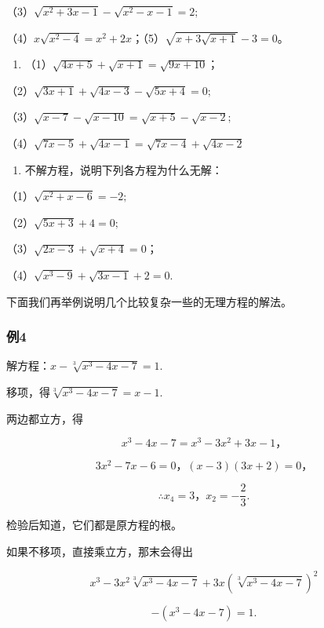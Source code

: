（3）\(\sqrt{x^2 + 3x - 1} - \sqrt{x^2 - x - 1} = 2;\)

（4）\(x\sqrt{x^2 - 4} = x^2 + 2x\)；（5）\(\sqrt{x + 3\sqrt{x + 1}} - 3 = 0\)。

\begin{enumerate}[start=4]
\item
  （1）\(\sqrt{4x + 5} + \sqrt{x + 1} = \sqrt{9x + 10}\)；
\end{enumerate}

（2）\(\sqrt{3x + 1} +\sqrt{4x - 3} -\sqrt{5x + 4} = 0;\)

（3）\(\sqrt{x - 7} - \sqrt{x - 10} = \sqrt{x + 5} - \sqrt{x - 2};\)

（4）\(\sqrt{7x - 5} +\sqrt{4x - 1} = \sqrt{7x - 4} +\sqrt{4x - 2}\)

\begin{enumerate}[start=5]
\item
  不解方程，说明下列各方程为什么无解：
\end{enumerate}

（1）\(\sqrt{x^2 + x - 6} = -2;\)

（2）\(\sqrt{5x + 3} + 4 = 0;\)

（3）\(\sqrt{2x - 3} + \sqrt{x + 4} = 0\)；

（4）\(\sqrt{x^3 - 9} + \sqrt{3x - 1} + 2 = 0.\)

下面我们再举例说明几个比较复杂一些的无理方程的解法。

\subsubsection{例4}

解方程：\(x - \sqrt[3]{x^3 - 4x - 7} = 1.\)

 移项，得\(\sqrt[3]{x^3 - 4x - 7} = x - 1.\)

两边都立方，得

\[
x ^ {3} - 4 x - 7 = x ^ {3} - 3 x ^ {2} + 3 x - 1\text{，}
\]

\[
3 x ^ {2} - 7 x - 6 = 0\text{，} (x - 3) (3 x + 2) = 0\text{，}
\]

\[
\therefore x _ {4} = 3\text{，} x _ {2} = - \frac{2}{3}.
\]

检验后知道，它们都是原方程的根。

 如果不移项，直接乘立方，那末会得出

\[
x ^ {3} - 3 x ^ {2} \sqrt[3]{x ^ {3} - 4 x - 7} + 3 x (\sqrt[3]{x ^ {3} - 4 x - 7}) ^ {2}
\]

\[
- (x ^ {3} - 4 x - 7) = 1.
\]


